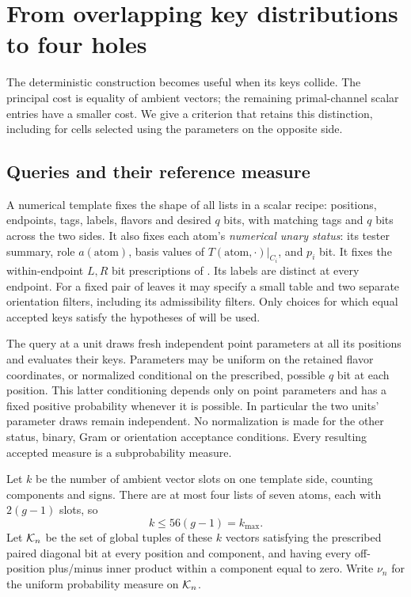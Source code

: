 \section{From overlapping key distributions to four holes}\label{sec:collision}

The deterministic construction becomes useful when its keys collide.
The principal cost is equality of ambient vectors; the remaining
primal-channel scalar entries have a smaller cost.  We give a
criterion that retains this distinction, including for cells selected
using the parameters on the opposite side.

\subsection{Queries and their reference measure}

A numerical template fixes the shape of all lists in a scalar
recipe: positions, endpoints, tags, labels, flavors and desired
$q$ bits, with matching tags and $q$ bits across the two sides.
It also fixes each atom's \emph{numerical unary status}: its tester
summary, role $a(\mathrm{atom})$, basis values of
$T(\mathrm{atom},\cdot)|_{C_i}$, and $p_i$ bit.
It fixes the within-endpoint $L,R$ bit prescriptions of
. Its labels are distinct at every endpoint.
For a fixed pair of leaves it may specify a small table and two
separate orientation filters, including its admissibility filters.
Only choices for which equal accepted keys satisfy the hypotheses
of  will be used.

The query at a unit draws fresh independent point parameters at
all its positions and evaluates their keys.  Parameters may be
uniform on the retained flavor coordinates, or normalized
conditional on the prescribed, possible $q$ bit at each position.
This latter conditioning depends only on point parameters and
has a fixed positive probability whenever it is possible.  In
particular the two units' parameter draws remain independent.
No normalization is made for the other status, binary, Gram or
orientation acceptance conditions.  Every resulting accepted
measure is a subprobability measure.

Let $k$ be the number of ambient vector slots on one template
side, counting components and signs.  There are at most four
lists of seven atoms, each with $2(g-1)$ slots, so
\begin{equation}\label{eq:key-rank-budget}
 k\le 56(g-1)=k_{\max}.
\end{equation}
Let $\mathcal K_n$ be the set of global tuples of these $k$ vectors
satisfying the prescribed paired diagonal bit at every position
and component, and having every off-position plus/minus inner
product within a component equal to zero.  Write $\nu_n$ for
the uniform probability measure on $\mathcal K_n$.

